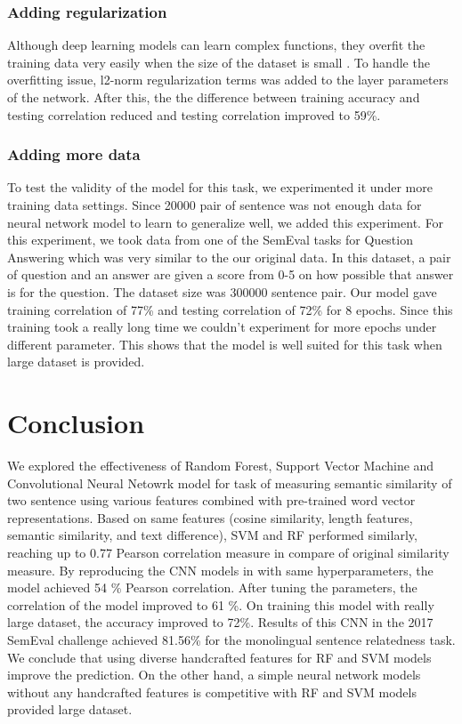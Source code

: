 \documentclass{article} %
\begin{document}
	 \subsubsection{Adding regularization}
	 Although deep learning models can learn complex functions, they overfit the training data very easily when the size of the dataset is small \cite{CNN-rank}. To handle the overfitting issue, l2-norm regularization terms was added to the layer parameters of the network. After this, the the difference between training accuracy and testing correlation reduced and testing correlation improved to 59\%.
	 
	 \subsubsection{Adding more data}
	 To test the validity of the model for this task, we experimented it under more training data settings. Since 20000 pair of sentence was not enough data for neural network model to learn to generalize well, we added this experiment. For this experiment, we took data from one of the SemEval tasks for Question Answering which was very similar to the our original data. In this dataset, a pair of question and an answer are given a score from 0-5 on how possible that answer is for the question. The dataset size was 300000 sentence pair. Our model gave training correlation of 77\% and testing correlation of 72\% for 8 epochs. Since this training took a really long time we couldn't experiment for more epochs under different parameter. This shows that the model is well suited for this task when large dataset is provided.

	\section{Conclusion}
   We explored the effectiveness of Random Forest, Support Vector Machine and Convolutional Neural Netowrk model for task of measuring semantic similarity of two sentence using various features combined with pre-trained word vector representations. Based on same features (cosine similarity, length features, semantic similarity, and text difference), SVM and RF performed similarly, reaching up to 0.77 Pearson correlation measure in compare of original similarity measure. By reproducing the CNN models in \cite{CNN} with same hyperparameters, the model achieved 54 \% Pearson correlation. After tuning the parameters, the correlation of the model improved to 61 \%. On training this model with really large dataset, the accuracy improved to 72\%. Results of this CNN in the 2017 SemEval challenge achieved 81.56\%  for the monolingual sentence relatedness task. We conclude that using diverse handcrafted features for RF and SVM models improve the prediction. On the other hand, a simple neural network models without any handcrafted features is competitive with RF and SVM models provided large dataset. 
    	
\end{document}
